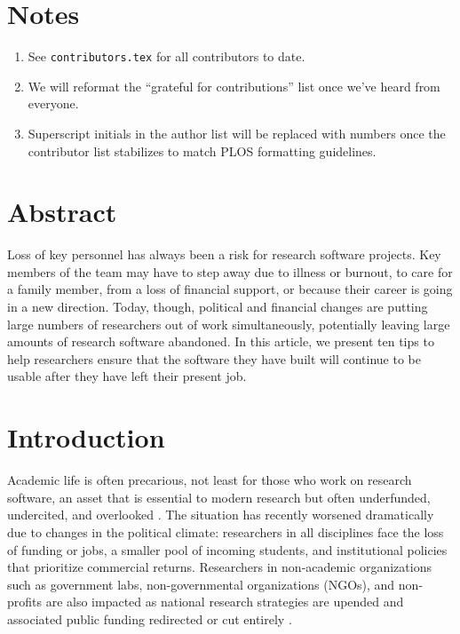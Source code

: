 \documentclass[10pt,letterpaper]{article}
\begin{document}
\section*{Notes}

\begin{enumerate}
\item
  See \texttt{contributors.tex} for all contributors to date.
\item
  We will reformat the ``grateful for contributions'' list once we've heard from everyone.
\item
  Superscript initials in the author list will be replaced with numbers once the contributor list stabilizes to match PLOS formatting guidelines.
\end{enumerate}

\section*{Abstract}

Loss of key personnel has always been a risk for research software projects.
Key members of the team may have to step away due to illness or burnout,
to care for a family member,
from a loss of financial support,
or because their career is going in a new direction.
Today,
though,
political and financial changes are putting large numbers of researchers out of work simultaneously,
potentially leaving large amounts of research software abandoned.
In this article,
we present ten tips to help researchers ensure that
the software they have built will continue to be usable
after they have left their present job.

\linenumbers

\section*{Introduction}

Academic life is often precarious,
not least for those who work on research software,
an asset that is essential to modern research \cite{Pearson2025}
but often underfunded, undercited, and overlooked \cite{Carver2022}.
The situation has recently worsened dramatically due to changes in the political climate:
researchers in all disciplines face the loss of funding or jobs,
a smaller pool of incoming students,
and institutional policies that prioritize commercial returns.
Researchers in non-academic organizations
such as government labs, non-governmental organizations (NGOs), and non-profits are also impacted \cite{Woodward2025}
as national research strategies are upended
and associated public funding redirected or cut entirely \cite{Nature2025}.
\end{document}
